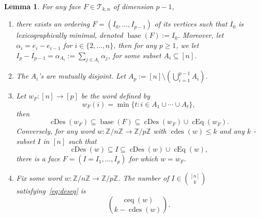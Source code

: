 \documentclass[10pt,a4paper]{amsart}
\theoremstyle{plain}
\newtheorem{lemma}[theorem]{Lemma}
\theoremstyle{definition}
\newcommand{\Z}{\mathbb{Z}}
\newcommand{\Tri}{\mathcal{T}_{k,n}}
\DeclareMathOperator{\base}{base}
\DeclareMathOperator{\cEq}{cEq}
\DeclareMathOperator{\cDes}{cDes}
\DeclareMathOperator{\cdes}{cdes}
\DeclareMathOperator{\ceq}{ceq}
\begin{document}
\begin{lemma}\label{lem:alcove_to_word}
	For any face $ F \in \Tri $ of dimension $ p-1 $,
	\begin{enumerate}
		\item there exists an ordering $ F =(I_0,\dots,I_{p-1}) $ of its vertices such that $I_0$ is lexicographically
		minimal, denoted $ \base(F):= I_0 $. Moreover, let $\alpha_i = e_{i} - e_{i-1}$ for $i \in \{2,\dots,n\}$, then
		for any $p \geq 1$, we let $I_{p} - I_{p-1} = \alpha_{A_i}:= \sum_{j\in A_i}\alpha_j$, for some subset $A_i \subseteq [n]$.
		\item The $ A_i $'s are mutually disjoint. Let $ A_{p}:= [n] \setminus \left(\bigcup_{i=1}^{p-1} A_i\right) $.
		\item Let $ w_F: [n] \to [p] $ be the word defined by
		\begin{equation}\label{eq:wF}
			w_F(i) = \min\{t: i \in A_1 \cup \cdots \cup A_t\},
		\end{equation}
		then
		\begin{equation}\label{eq:Fdeseq}
			\cDes(w_F) \subseteq \base(F) \subseteq \cDes(w_F) \cup \cEq(w_F).
		\end{equation}
		Conversely, for any word $ w: \Z/n\Z \to \Z/p\Z $ with $ \cdes(w) \leq k $ and any $ k $ -subset $ I $ in $ [n] $ such that
		\begin{equation}\label{eq:deseq}
			\cDes(w) \subseteq I \subseteq \cDes(w) \cup \cEq(w),
		\end{equation}
		there is a face $ F = (I = I_1,\dots,I_{p}) $ for which $ w = w_F $.
		\item Fix some word $ w: \Z/n\Z \to \Z/p\Z $. The number of $ I \in \binom{[n]}{k} $
		satisfying~\eqref{eq:deseq} is
		\[
			\binom{\ceq(w)}{k - \cdes(w)}.
		\]
	\end{enumerate}
\end{lemma}
\end{document}
